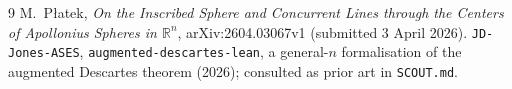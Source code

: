 \documentclass[11pt]{article}
\theoremstyle{definition}
\theoremstyle{remark}
\begin{document}
\begin{thebibliography}{9}
 M.~Płatek, \emph{On the Inscribed Sphere and Concurrent Lines through the Centers of
Apollonius Spheres in $\mathbb{R}^n$}, arXiv:2604.03067v1 (submitted 3 April 2026).
 \texttt{JD-Jones-ASES}, \texttt{augmented-descartes-lean}, a general-$n$
formalisation of the augmented Descartes theorem (2026); consulted as prior art in
\texttt{SCOUT.md}.
\end{thebibliography}
\end{document}
